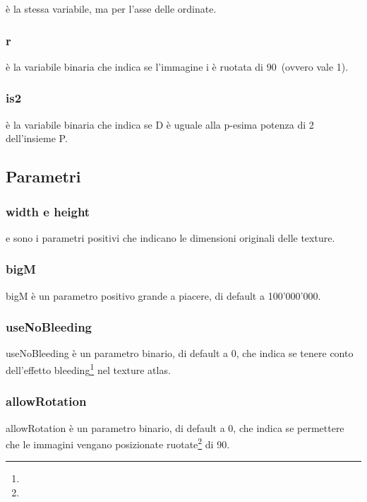 {\beforeYij} è la stessa variabile, ma per l'asse delle ordinate.


\subsubsection{r}

{\ri} è la variabile binaria che indica se l'immagine i è ruotata di 90\degree\ (ovvero \ri{} vale 1).

\subsubsection{is2}
\isTp{} è la variabile binaria che indica se D è uguale alla p-esima potenza di 2 dell'insieme P.









\subsection{Parametri}

\subsubsection{width e height}

\widthi{} e \heighti{} sono i parametri positivi che indicano le dimensioni originali delle texture.

\subsubsection{bigM}
bigM è un parametro positivo grande a piacere, di default a 100’000’000. %

\subsubsection{useNoBleeding}
useNoBleeding è un parametro binario, di default a 0, che indica se tenere conto dell'effetto bleeding\footnote{\footBleeding} nel texture atlas. 

\subsubsection{allowRotation}
allowRotation è un parametro binario, di default a 0, che indica se permettere che le immagini vengano posizionate ruotate\footnote{\footRotation} di 90\degree.%


